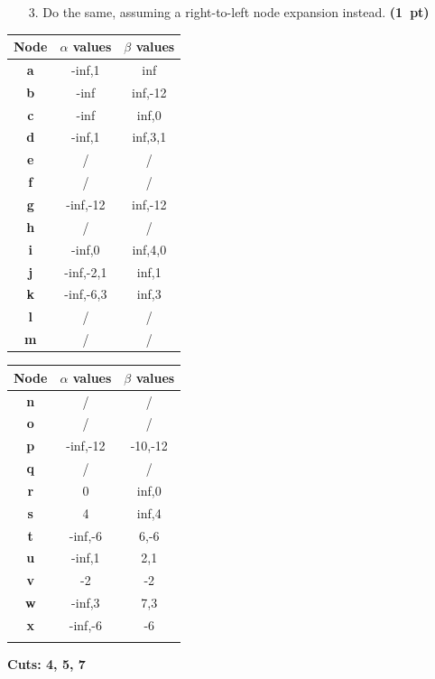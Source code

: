\documentclass[11pt,a4paper]{report}
\begin{document}
\begin{enumerate}
\item[3.] Do the same, assuming a right-to-left node expansion instead.  \textbf{(1~pt)}
\end{enumerate}

\begin{answers}[8cm]
      \begin{multicols}{2}
      \begin{tabular}{ccc}
      Node & $\alpha$ values & $\beta$ values\\
      \hline
      \textbf{a} &-inf,1 &inf \\ 
      \textbf{b} &-inf  &inf,-12  \\
      \textbf{c} &-inf  &inf,0  \\
      \textbf{d} &-inf,1  &inf,3,1  \\
      \textbf{e} &/  &/  \\
      \textbf{f} &/  &/  \\
      \textbf{g} &-inf,-12  &inf,-12  \\
      \textbf{h} &/  &/  \\
      \textbf{i} &-inf,0  &inf,4,0  \\
      \textbf{j} &-inf,-2,1  &inf,1  \\
      \textbf{k} &-inf,-6,3  &inf,3  \\
      \textbf{l} &/  &/  \\
      \textbf{m} &/  &/  \\ 
      \end{tabular}
      
      \begin{tabular}{ccc}
      Node & $\alpha$ values & $\beta$ values\\
      \hline
      \textbf{n} &/  &/  \\
      \textbf{o} &/  &/  \\
      \textbf{p} &-inf,-12  &-10,-12  \\
      \textbf{q} &/  &/  \\
      \textbf{r} &0  &inf,0  \\
      \textbf{s} &4  &inf,4  \\
      \textbf{t} &-inf,-6  &6,-6  \\
      \textbf{u} &-inf,1  &2,1  \\
      \textbf{v} &-2  &-2  \\
      \textbf{w} &-inf,3  &7,3  \\
      \textbf{x} &-inf,-6  &-6  \\
       &  &  \\
      \end{tabular}
      \end{multicols}
      
\textbf{Cuts: 4, 5, 7} 
\end{answers}
\end{document}
